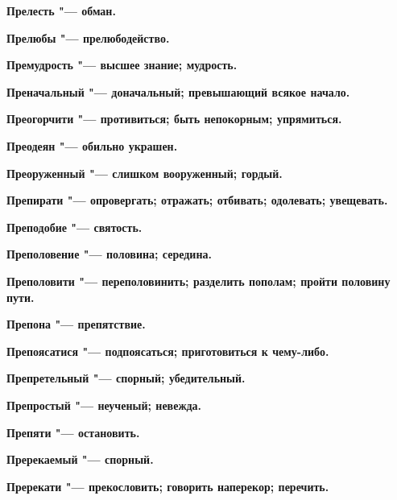 \begin{mymulticols}{2}
\bfseries Прелесть\normalfont{} "--- обман. 




\bfseries Прелюбы\normalfont{} "--- прелюбодейство. 




\bfseries Премудрость\normalfont{} "--- высшее знание; мудрость. 




\bfseries Преначальный\normalfont{} "--- доначальный; превышающий всякое начало. 




\bfseries Преогорчити\normalfont{} "--- противиться; быть непокорным; упрямиться. 




\bfseries Преодеян\normalfont{} "--- обильно украшен. 




\bfseries Преоруженный\normalfont{} "--- слишком вооруженный; гордый. 




\bfseries Препирати\normalfont{} "--- опровергать; отражать; отбивать; одолевать; увещевать. 




\bfseries Преподобие\normalfont{} "--- святость. 




\bfseries Преполовение\normalfont{} "--- половина; середина. 




\bfseries Преполовити\normalfont{} "--- переполовинить; разделить пополам; пройти половину пути. 




\bfseries Препона\normalfont{} "--- препятствие. 




\bfseries Препоясатися\normalfont{} "--- подпоясаться; приготовиться к чему-либо. 




\bfseries Препретельный\normalfont{} "--- спорный; убедительный. 




\bfseries Препростый\normalfont{} "--- неученый; невежда. 




\bfseries Препяти\normalfont{} "--- остановить. 




\bfseries Пререкаемый\normalfont{} "--- спорный. 




\bfseries Пререкати\normalfont{} "--- прекословить; говорить наперекор; перечить. 





\end{mymulticols}
